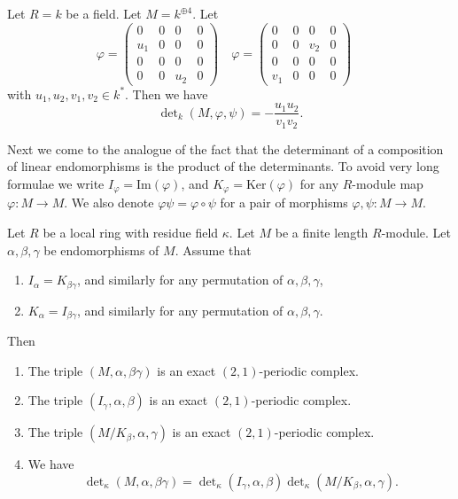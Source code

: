 \begin{example}
\label{example-a-la-oort}
Let $R = k$ be a field.
Let $M = k^{\oplus 4}$.
Let
$$
\varphi =
\left(
\begin{matrix}
  0 &   0 &   0 &   0 \\
u_1 &   0 &   0 &   0 \\
  0 &   0 &   0 &   0 \\
  0 &   0 & u_2 &   0
\end{matrix}
\right)
\quad
\varphi =
\left(
\begin{matrix}
  0 &   0 &   0 &   0 \\
  0 &   0 & v_2 &   0 \\
  0 &   0 &   0 &   0 \\
v_1 &   0 &   0 &   0
\end{matrix}
\right)
\quad
$$
with $u_1, u_2, v_1, v_2 \in k^*$.
Then we have
$$
\det\nolimits_k(M, \varphi, \psi) = -\frac{u_1u_2}{v_1v_2}.
$$
\end{example}

\noindent
Next we come to the analogue of the fact that the determinant
of a composition of linear endomorphisms is the product of
the determinants. To avoid very long formulae we
write $I_\varphi = \text{Im}(\varphi)$, and
$K_\varphi = \text{Ker}(\varphi)$
for any $R$-module map $\varphi : M \to M$.
We also denote $\varphi\psi = \varphi \circ \psi$
for a pair of morphisms $\varphi, \psi : M \to M$.

\begin{lemma}
\label{lemma-multiplicativity-determinant}
Let $R$ be a local ring with residue field $\kappa$.
Let $M$ be a finite length $R$-module.
Let $\alpha, \beta, \gamma$ be endomorphisms of $M$.
Assume that
\begin{enumerate}
\item $I_\alpha = K_{\beta\gamma}$, and similarly for any permutation
of $\alpha, \beta, \gamma$,
\item $K_\alpha = I_{\beta\gamma}$, and similarly for any permutation
of $\alpha, \beta, \gamma$.
\end{enumerate}
Then
\begin{enumerate}
\item The triple $(M, \alpha, \beta\gamma)$
is an exact $(2, 1)$-periodic complex.
\item The triple $(I_\gamma, \alpha, \beta)$
is an exact $(2, 1)$-periodic complex.
\item The triple $(M/K_\beta, \alpha, \gamma)$
is an exact $(2, 1)$-periodic complex.
\item We have
$$
\det\nolimits_\kappa(M, \alpha, \beta\gamma)
=
\det\nolimits_\kappa(I_\gamma, \alpha, \beta)
\det\nolimits_\kappa(M/K_\beta, \alpha, \gamma).
$$
\end{enumerate}
\end{lemma}

